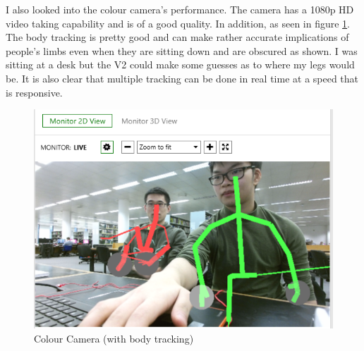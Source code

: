 \documentclass[11pt]{article}
\begin{document}
I also looked into the colour camera's performance. The camera has a 1080p HD
video taking capability and is of a good quality. In addition, as seen in 
figure \ref{KinectColour}. The body tracking is pretty good and can make rather
accurate implications of people's limbs even when they are sitting down and are
obscured as shown. I was sitting at a desk but the V2 could make some guesses
as to where my legs would be. It is also clear that multiple tracking can be done
in real time at a speed that is responsive.
\begin{center}
	\begin{figure}[H]
		\begin{center}
			\includegraphics[scale=0.5]{pics/KinectColor}
				\caption{Colour Camera (with body tracking)}
				\label{KinectColour}
		\end{center}
	\end{figure}
\end{center}
\end{document}

